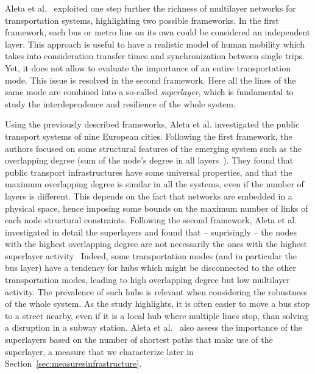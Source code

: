 Aleta et al.~\cite{Aleta2017Multilayer} exploited one step further the richness of multilayer networks for transportation systems, highlighting two possible frameworks. In the first framework, each bus or metro line on its own could be considered an independent layer. This approach is useful to have a realistic model of human mobility which takes into consideration transfer times and synchronization between single trips. Yet, it does not allow to evaluate the importance of an entire transportation mode. This issue is resolved in the second framework. Here all the lines of the same mode are combined into a so-called \textit{superlayer}, which is fundamental to study the interdependence and resilience of the whole system. 

Using the previously described frameworks, Aleta et al. \cite{Aleta2017Multilayer} investigated the public transport systems of nine European cities. Following the first framework, the authors focused on some structural features of the emerging system such as the overlapping degree (sum of the node's degree in all layers~\cite{battiston2014structural}). They found that public transport infrastructures have some universal properties, and that the maximum overlapping degree is similar in all the systems, even if the number of layers is different. This depends on the fact that networks are embedded in a physical space, hence imposing some bounds on the maximum number of links of each node structural constraints. Following the second framework, Aleta et al.~\cite{Aleta2017Multilayer} investigated in detail the superlayers and found that -- suprisingly -- the nodes with the highest overlapping degree are not necessarily the ones with the highest superlayer activity~\cite{nicosia2015measuring} Indeed, some transportation modes (and in particular the bus layer) have a tendency for hubs which might be disconnected to the other transportation modes, leading to high overlapping degree but low multilayer activity. The prevalence of such hubs is relevant when considering the robustness of the whole system. As the study highlights, it is often easier to move a bus stop to a street nearby, even if it is a local hub where multiple lines stop, than solving a disruption in a subway station. Aleta et al.~\cite{Aleta2017Multilayer} also assess the importance of the superlayers based on the number of shortest paths that make use of the superlayer, a measure that we characterize later in Section~\ref{sec:measuresinfrastructure}.

